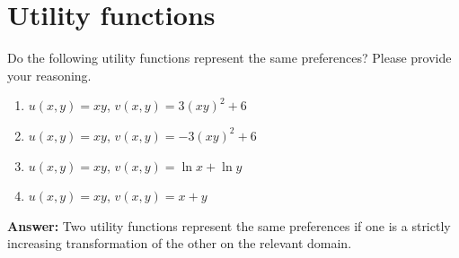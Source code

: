 \documentclass[12pt,a4paper]{article}
\begin{document}
\maketitle

\section{Utility functions}
Do the following utility functions represent the same preferences? Please provide your reasoning.

\begin{enumerate}[label=(\alph*)]
  \item $u(x,y)=xy$, \quad $v(x,y)=3(xy)^2+6$
  \item $u(x,y)=xy$, \quad $v(x,y)=-3(xy)^2+6$
  \item $u(x,y)=xy$, \quad $v(x,y)=\ln x+\ln y$
  \item $u(x,y)=xy$, \quad $v(x,y)=x+y$
\end{enumerate}

\vspace{0.5cm}

\noindent\textbf{Answer:} Two utility functions represent the same preferences if one is a strictly increasing transformation of the other on the relevant domain.
\end{document}
